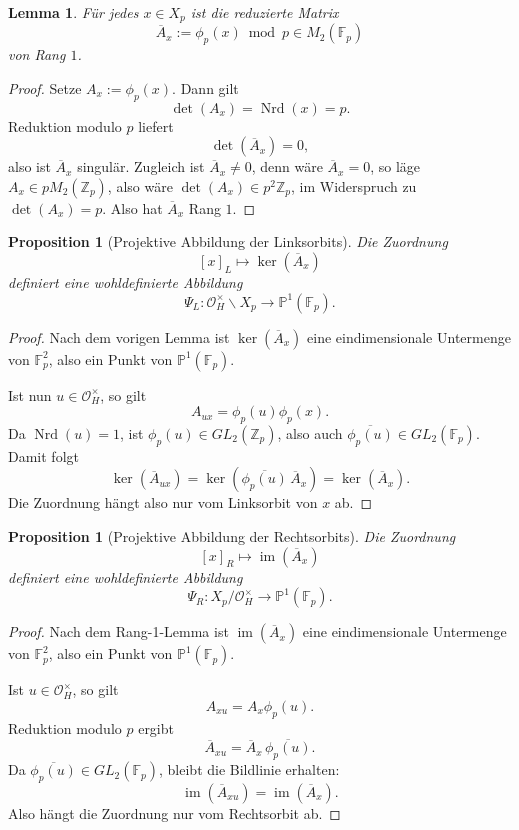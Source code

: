 \documentclass[12pt,a4paper]{article}
\theoremstyle{plain}
\newtheorem{lemma}[satz]{Lemma}
\newtheorem{proposition}[satz]{Proposition}
\theoremstyle{definition}
\theoremstyle{remark}
\newcommand{\OH}{\mathcal O_H}
\newcommand{\Z}{\mathbb Z}
\newcommand{\Fp}{\mathbb F_p}
\newcommand{\PP}{\mathbb P}
\newcommand{\nrd}{\operatorname{Nrd}}
\begin{document}
	\begin{lemma}
		Für jedes \(x\in X_p\) ist die reduzierte Matrix
		\[
		\overline{A}_x:=\phi_p(x)\bmod p \in M_2(\Fp)
		\]
		von Rang \(1\).
	\end{lemma}
	
	\begin{proof}
		Setze \(A_x:=\phi_p(x)\). Dann gilt
		\[
		\det(A_x)=\nrd(x)=p.
		\]
		Reduktion modulo \(p\) liefert
		\[
		\det(\overline{A}_x)=0,
		\]
		also ist \(\overline{A}_x\) singulär. Zugleich ist \(\overline{A}_x\neq 0\), denn wäre \(\overline{A}_x=0\), so läge \(A_x\in pM_2(\Z_p)\), also wäre \(\det(A_x)\in p^2\Z_p\), im Widerspruch zu \(\det(A_x)=p\). Also hat \(\overline{A}_x\) Rang \(1\).
	\end{proof}
	
	\begin{proposition}[Projektive Abbildung der Linksorbits]
		Die Zuordnung
		\[
		[x]_L \longmapsto \ker(\overline{A}_x)
		\]
		definiert eine wohldefinierte Abbildung
		\[
		\Psi_L:\OH^\times\backslash X_p \longrightarrow \PP^1(\Fp).
		\]
	\end{proposition}
	
	\begin{proof}
		Nach dem vorigen Lemma ist \(\ker(\overline{A}_x)\) eine eindimensionale Untermenge von \(\Fp^2\), also ein Punkt von \(\PP^1(\Fp)\).
		
		Ist nun \(u\in\OH^\times\), so gilt
		\[
		A_{ux}=\phi_p(u)\phi_p(x).
		\]
		Da \(\nrd(u)=1\), ist \(\phi_p(u)\in GL_2(\Z_p)\), also auch \(\overline{\phi_p(u)}\in GL_2(\Fp)\). Damit folgt
		\[
		\ker(\overline{A}_{ux})
		=
		\ker(\overline{\phi_p(u)}\,\overline{A}_x)
		=
		\ker(\overline{A}_x).
		\]
		Die Zuordnung hängt also nur vom Linksorbit von \(x\) ab.
	\end{proof}
	
	\begin{proposition}[Projektive Abbildung der Rechtsorbits]
		Die Zuordnung
		\[
		[x]_R \longmapsto \operatorname{im}(\overline{A}_x)
		\]
		definiert eine wohldefinierte Abbildung
		\[
		\Psi_R:X_p/\OH^\times \longrightarrow \PP^1(\Fp).
		\]
	\end{proposition}
	
	\begin{proof}
		Nach dem Rang-1-Lemma ist \(\operatorname{im}(\overline{A}_x)\) eine eindimensionale Untermenge von \(\Fp^2\), also ein Punkt von \(\PP^1(\Fp)\).
		
		Ist \(u\in\OH^\times\), so gilt
		\[
		A_{xu}=A_x\phi_p(u).
		\]
		Reduktion modulo \(p\) ergibt
		\[
		\overline{A}_{xu}=\overline{A}_x\,\overline{\phi_p(u)}.
		\]
		Da \(\overline{\phi_p(u)}\in GL_2(\Fp)\), bleibt die Bildlinie erhalten:
		\[
		\operatorname{im}(\overline{A}_{xu})
		=
		\operatorname{im}(\overline{A}_x).
		\]
		Also hängt die Zuordnung nur vom Rechtsorbit ab.
	\end{proof}
	
\end{document}
